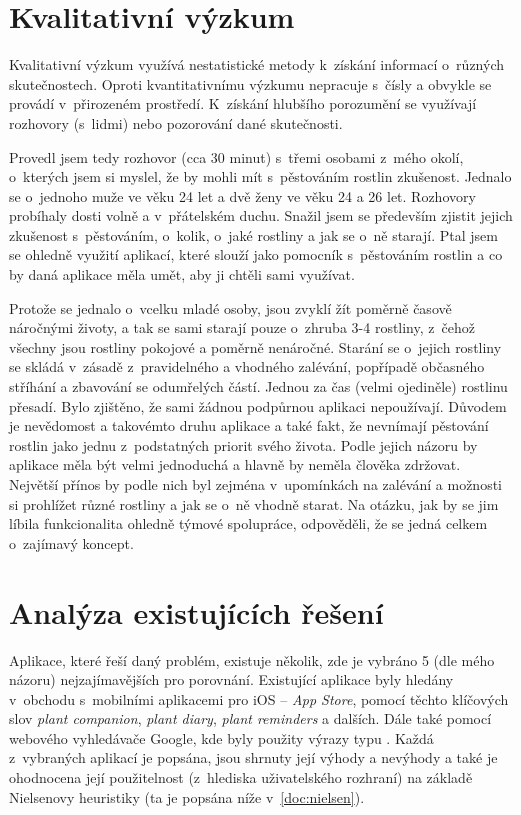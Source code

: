 \documentclass[thesis=M,czech]{FITthesis}[2019/12/23]
\begin{document}
\section{Kvalitativní výzkum}
Kvalitativní výzkum využívá nestatistické metody k~získání informací o~různých skutečnostech. Oproti kvantitativnímu výzkumu nepracuje s~čísly a obvykle se provádí v~přirozeném prostředí. K~získání hlubšího porozumění se využívají rozhovory (s~lidmi) nebo pozorování dané skutečnosti.

Provedl jsem tedy rozhovor (cca 30 minut) s~třemi osobami z~mého okolí, o~kterých jsem si myslel, že by mohli mít s~pěstováním rostlin zkušenost. Jednalo se o~jednoho muže ve věku 24 let a dvě ženy ve věku 24 a 26 let. Rozhovory probíhaly dosti volně a v~přátelském duchu. Snažil jsem se především zjistit jejich zkušenost s~pěstováním, o~kolik, o~jaké rostliny a jak se o~ně starají. Ptal jsem se ohledně využití aplikací, které slouží jako pomocník s~pěstováním rostlin a co by daná aplikace měla umět, aby ji chtěli sami využívat.

Protože se jednalo o~vcelku mladé osoby, jsou zvyklí žít poměrně časově náročnými životy, a tak se sami starají pouze o~zhruba 3-4 rostliny, z~čehož všechny jsou rostliny pokojové a poměrně nenáročné. Starání se o~jejich rostliny se skládá v~zásadě z~pravidelného a vhodného zalévání, popřípadě občasného stříhání a zbavování se odumřelých částí. Jednou za čas (velmi ojediněle) rostlinu přesadí. Bylo zjištěno, že sami žádnou podpůrnou aplikaci nepoužívají. Důvodem je nevědomost a takovémto druhu aplikace a také fakt, že nevnímají pěstování rostlin jako jednu z~podstatných priorit svého života. Podle jejich názoru by aplikace měla být velmi jednoduchá a hlavně by neměla člověka zdržovat. Největší přínos by podle nich byl zejména v~upomínkách na zalévání a možnosti si prohlížet různé rostliny a jak se o~ně vhodně starat. Na otázku, jak by se jim líbila funkcionalita ohledně týmové spolupráce, odpověděli, že se jedná celkem o~zajímavý koncept.

\section{Analýza existujících řešení}
Aplikace, které řeší daný problém, existuje několik, zde je vybráno 5 (dle mého názoru) nejzajímavějších pro porovnání. Existující aplikace byly hledány v~obchodu s~mobilními aplikacemi pro iOS -- \textit{App Store}, pomocí těchto klíčových slov \textit{plant companion}, \textit{plant diary}, \textit{plant reminders} a dalších. Dále také pomocí webového vyhledávače Google, kde byly použity výrazy typu . Každá z~vybraných aplikací je popsána, jsou shrnuty její výhody a nevýhody a také je ohodnocena její použitelnost (z~hlediska uživatelského rozhraní) na základě Nielsenovy heuristiky (ta je popsána níže v~\ref{doc:nielsen}).
\end{document}
